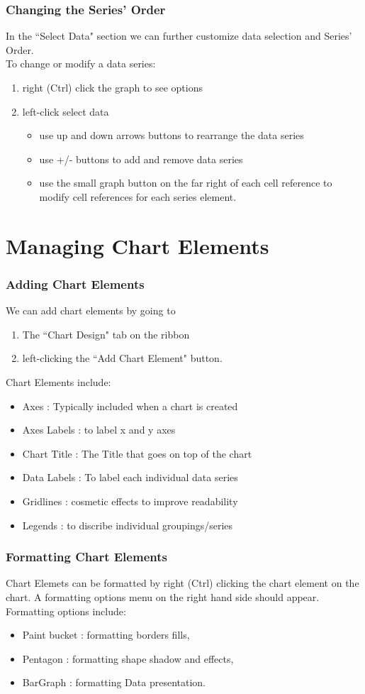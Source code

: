 \documentclass[12pt]{beamer}
\begin{document}
	\begin{frame}
		\frametitle{Changing the Series' Order}
		In the ``Select Data" section we can further customize data selection and Series' Order.  \\
		To change or modify a data series:
		\begin{enumerate}
			\item right (Ctrl) click the graph to see options
			\item left-click select data
			\begin{itemize}
				\item use up and down arrows buttons to rearrange the data series
			\item use +/- buttons to add and remove data series
			\item use the small graph button on the far right of each cell reference to modify cell references for each series element.
			\end{itemize}	
\end{enumerate}
\end{frame}
\section{Managing Chart Elements}
	\begin{frame}
		\frametitle{Adding Chart Elements}
		We can add chart elements by going to
		\begin{enumerate}
			\item The ``Chart Design" tab on the ribbon
			\item left-clicking the ``Add Chart Element" button.
		\end{enumerate}
	Chart Elements include:
	\begin{itemize}
		\item Axes : Typically included when a chart is created
		\item Axes Labels : to label x and y axes
		\item Chart Title : The Title that goes on top of the chart
		\item Data Labels : To label each individual data series 
		\item Gridlines : cosmetic effects to improve readability
		\item Legends : to discribe individual groupings/series 
	\end{itemize} 
	\end{frame}

	\begin{frame}
		\frametitle{Formatting Chart Elements}
		Chart Elemets can be formatted by right (Ctrl) clicking the chart element on the chart. A formatting options menu on the right hand side should appear. Formatting options include:
		\begin{itemize}
			\item Paint bucket : formatting borders fills,
			\item Pentagon : formatting shape shadow and effects,
			\item BarGraph : formatting Data presentation.
		\end{itemize}
	\end{frame}
\end{document}
